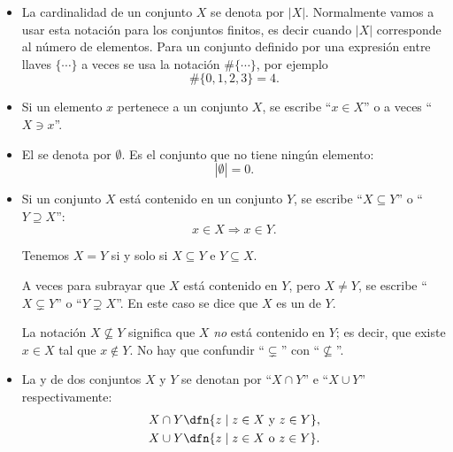 \begin{itemize}
\item La cardinalidad de un conjunto $X$ se denota por $|X|$. Normalmente vamos
  a usar esta notación para los conjuntos finitos, es decir cuando $|X|$
  corresponde al número de elementos. Para un conjunto definido por una
  expresión entre llaves $\{ \cdots \}$ a veces se usa la notación
  $\# \{ \cdots \}$, por ejemplo
  $$\# \{ 0,1,2,3 \} = 4.$$

\item Si un elemento $x$ pertenece a un conjunto $X$, se escribe ``$x\in X$'' o
  a veces ``$X \ni x$''.

  \begin{center}
  \end{center}

\item El  se denota por $\emptyset$. Es el conjunto que no
  tiene ningún elemento:
  $$|\emptyset| = 0.$$

\item Si un conjunto $X$ está contenido en un conjunto $Y$, se escribe
  ``$X\subseteq Y$'' o ``$Y \supseteq X$'':
  $$x\in X \Longrightarrow x\in Y.$$

  \begin{center}
  \end{center}

  Tenemos $X = Y$ si y solo si $X\subseteq Y$ e $Y\subseteq X$.

  A veces para subrayar que $X$ está contenido en $Y$, pero $X \ne Y$,
  se escribe ``$X\subsetneq Y$'' o ``$Y \supsetneq X$''. En este caso se dice
  que $X$ es un  de $Y$.

  La notación $X \not\subseteq Y$ significa que $X$ \emph{no} está contenido en
  $Y$; es decir, que existe $x\in X$ tal que $x \notin Y$. No hay que confundir
  ``$\subsetneq$'' con ``$\not\subseteq$''.

\item La  y  de dos conjuntos $X$ y $Y$ se
  denotan por ``$X\cap Y$'' e ``$X\cup Y$'' respectivamente:
  \begin{align*}
    X\cap Y & \dfn \{ z \mid z\in X \text{ y } z\in Y \},\\
    X\cup Y & \dfn \{ z \mid z\in X \text{ o } z\in Y \}.
  \end{align*}


\end{itemize}
